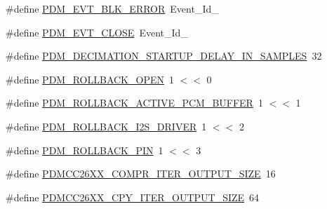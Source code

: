 \begin{DoxyCompactItemize}
\#define \hyperlink{_p_d_m_c_c26_x_x_8h_a0ef5385ca6074d11ed9eaa6480e897db}{P\+D\+M\+\_\+\+E\+V\+T\+\_\+\+B\+L\+K\+\_\+\+E\+R\+R\+O\+R}~Event\+\_\+\+Id\+\_
\item 
\#define \hyperlink{_p_d_m_c_c26_x_x_8h_a93f987ca1724197322ca6c51e3224139}{P\+D\+M\+\_\+\+E\+V\+T\+\_\+\+C\+L\+O\+S\+E}~Event\+\_\+\+Id\+\_
\item 
\#define \hyperlink{_p_d_m_c_c26_x_x_8h_ae4d19965c15ec934730399d8213f6bcb}{P\+D\+M\+\_\+\+D\+E\+C\+I\+M\+A\+T\+I\+O\+N\+\_\+\+S\+T\+A\+R\+T\+U\+P\+\_\+\+D\+E\+L\+A\+Y\+\_\+\+I\+N\+\_\+\+S\+A\+M\+P\+L\+E\+S}~32
\item 
\#define \hyperlink{_p_d_m_c_c26_x_x_8h_a738cf299bffb58343c5e6c19c599d926}{P\+D\+M\+\_\+\+R\+O\+L\+L\+B\+A\+C\+K\+\_\+\+O\+P\+E\+N}~1 $<$$<$ 0
\item 
\#define \hyperlink{_p_d_m_c_c26_x_x_8h_a272b8d1bec0c335958752093da6bf1fa}{P\+D\+M\+\_\+\+R\+O\+L\+L\+B\+A\+C\+K\+\_\+\+A\+C\+T\+I\+V\+E\+\_\+\+P\+C\+M\+\_\+\+B\+U\+F\+F\+E\+R}~1 $<$$<$ 1
\item 
\#define \hyperlink{_p_d_m_c_c26_x_x_8h_a4848632d9e39f5ca43518ca595269651}{P\+D\+M\+\_\+\+R\+O\+L\+L\+B\+A\+C\+K\+\_\+\+I2\+S\+\_\+\+D\+R\+I\+V\+E\+R}~1 $<$$<$ 2
\item 
\#define \hyperlink{_p_d_m_c_c26_x_x_8h_a35dad3615b028424efc41cd3cbc88a59}{P\+D\+M\+\_\+\+R\+O\+L\+L\+B\+A\+C\+K\+\_\+\+P\+I\+N}~1 $<$$<$ 3
\item 
\#define \hyperlink{_p_d_m_c_c26_x_x_8h_a300219dd1707acc79beded8dd7e4959f}{P\+D\+M\+C\+C26\+X\+X\+\_\+\+C\+O\+M\+P\+R\+\_\+\+I\+T\+E\+R\+\_\+\+O\+U\+T\+P\+U\+T\+\_\+\+S\+I\+Z\+E}~16
\item 
\#define \hyperlink{_p_d_m_c_c26_x_x_8h_a1aa9aa08415bec8441cf5e964262fe75}{P\+D\+M\+C\+C26\+X\+X\+\_\+\+C\+P\+Y\+\_\+\+I\+T\+E\+R\+\_\+\+O\+U\+T\+P\+U\+T\+\_\+\+S\+I\+Z\+E}~64
\end{DoxyCompactItemize}
